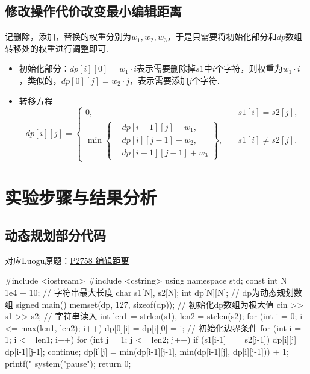 \documentclass[12pt, a4paper, oneside]{ctexart}
\numberwithin{equation}{section}  %
\newcounter{problem}  %
\begin{document}
\subsection{修改操作代价改变最小编辑距离}
    记删除，添加，替换的权重分别为$w_1,w_2,w_3$，于是只需要将初始化部分和$dp$数组转移处的权重进行调整即可.
    \begin{itemize}
        \item 初始化部分：$dp[i][0] = w_1\cdot i$表示需要删除掉$s1$中$i$个字符，则权重为$w_1\cdot i$，类似的，$dp[0][j] = w_2\cdot j$，表示需要添加$j$个字符.
        \item 转移方程
        \begin{equation*}
            dp[i][j]=\begin{cases}
                0,&\quad s1[i]=s2[j],\\
                \min\left\{\begin{aligned}
                    &dp[i-1][j]+w_1,\\
                    &dp[i][j-1]+w_2,\\
                    &dp[i-1][j-1]+w_3
                \end{aligned}\right\},&\quad s1[i]\neq s2[j].
            \end{cases}
        \end{equation*}
    \end{itemize}

\section{实验步骤与结果分析}
\subsection{动态规划部分代码}
    对应Luogu原题：\href{https://www.luogu.com.cn/problem/P2758}{P2758 编辑距离}
    \begin{cppcode}
#include <iostream>
#include <cstring>
using namespace std;
const int N = 1e4 + 10;  // 字符串最大长度
char s1[N], s2[N];
int dp[N][N];  // dp为动态规划数组
signed main() {
    memset(dp, 127, sizeof(dp));  // 初始化dp数组为极大值
    cin >> s1 >> s2;  // 字符串读入
    int len1 = strlen(s1), len2 = strlen(s2);
    for (int i = 0; i <= max(len1, len2); i++) dp[0][i] = dp[i][0] = i;  // 初始化边界条件
    for (int i = 1; i <= len1; i++) {
        for (int j = 1; j <= len2; j++) {
            if (s1[i-1] == s2[j-1]) {
                dp[i][j] = dp[i-1][j-1];
                continue;
            }
            dp[i][j] = min(dp[i-1][j-1], min(dp[i-1][j], dp[i][j-1])) + 1;
        }
    }
    printf("%
    system("pause");
    return 0;
}
    \end{cppcode}
\end{document}
